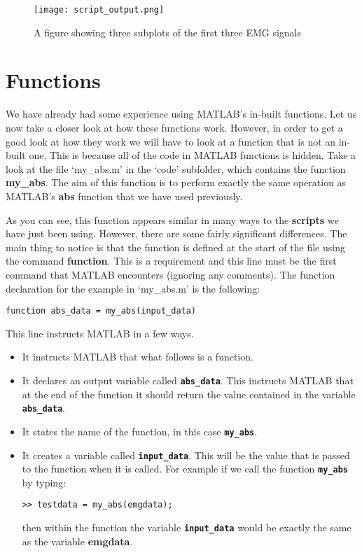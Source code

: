 \documentclass[12pt,a4paper]{article}
\begin{document}
\begin{figure}[H]
\begin{center}
\texttt{[image: script\_output.png]}
\caption{A figure showing three subplots of the first three EMG signals}
\label{fig:scriptoutput}
\end{center}
\end{figure}

\section{Functions}
We have already had some experience using MATLAB's in-built functions.  
Let us now take a closer look at how these functions work.  
However, in order to get a good look at how they work we will have to look at a function that is not an in-built one.  
This is because all of the code in MATLAB functions is hidden.  
Take a look at the file `my\_abs.m' in the `code' subfolder, which contains the function \textbf{my\_abs}.  
The aim of this function is to perform exactly the same operation as MATLAB's \textbf{abs} function that we have used previously.

As you can see, this function appears similar in many ways to the \textbf{scripts} we have just been using.  
However, there are some fairly significant differences.  
The main thing to notice is that the function is defined at the start of the file using the command \textbf{function}.  
This is a requirement and this line must be the first command that MATLAB encounters (ignoring any comments).  
The function declaration for the example in `my\_abs.m' is the following:
\begin{lstlisting}[style=Matlab-editor]
function abs_data = my_abs(input_data)
\end{lstlisting}
This line instructs MATLAB in a few ways.
\begin{itemize}
\item It instructs MATLAB that what follows is a function.
\item It declares an output variable called \textbf{\texttt{abs\_data}}.  This instructs MATLAB that at the end of the function it should return the value contained in the variable \textbf{\texttt{abs\_data}}.
\item It states the name of the function, in this case \textbf{\texttt{my\_abs}}.
\item It creates a variable called \textbf{\texttt{input\_data}}.  This will be the value that is passed to the function when it is called.  For example if we call the function \textbf{\texttt{my\_abs}} by typing:
\begin{lstlisting}[style=Matlab-editor]
>> testdata = my_abs(emgdata);
\end{lstlisting}
then within the function the variable \textbf{\texttt{input\_data}} would be exactly the same as the variable \textbf{emgdata}.
\end{itemize}
\end{document}
